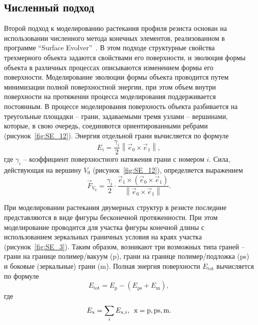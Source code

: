 \subsection{Численный подход}
Второй подход к моделированию растекания профиля резиста основан на использовании численного метода конечных элементов, реализованном в программе ``Surface Evolver''~\cite{Brakke_SE}. В этом подходе структурные свойства трехмерного объекта задаются свойствами его поверхности, и эволюция формы объекта в различных процессах описываются изменением формы его поверхности. Моделирование эволюции формы объекта проводится путем минимизации полной поверхностной энергии, при этом объем внутри поверхности на протяжении процесса моделирования поддерживается постоянным. В процессе моделирования поверхность объекта разбивается на треугольные площадки -- грани, задаваемыми тремя узлами -- вершинами, которые, в свою очередь, соединяются ориентированными ребрами (рисунок~\ref{fig:SE_12}). Энергия отдельной грани вычисляется по формуле
\begin{equation}
	E_i=\frac{\gamma_i}{2}\left\|\vec{e}_0 \times \vec{e}_1\right\|,
\end{equation}
где $\gamma_i$ -- коэффициент поверхностного натяжения грани с номером $i$. Сила, действующая на вершину $V_0$ (рисунок~\ref{fig:SE_12}), определяется выражением
\begin{equation}
	\vec{F}_{V_0}=\frac{\gamma_i}{2} \cdot \frac{\vec{e}_1 \times\left(\vec{e}_0 \times \vec{e}_1\right)}{\left\|\vec{e}_0 \times \vec{e}_1\right\|}.
\end{equation}

При моделировании растекания двумерных структур в резисте последние представляются в виде фигуры бесконечной протяженности. При этом моделирование проводится для участка фигуры конечной длины с использованием зеркальных граничных условия на краях участка (рисунок~\ref{fig:SE_3}). Таким образом, возникают три возможных типа граней -- грани на границе полимер/вакуум (p), грани на границе полимер/подложка (ps) и боковые (зеркальные) грани (m). Полная энергия поверхности $E_\mathrm{tot}$ вычисляется по формуле
\begin{equation}
	E_\mathrm{tot} = E_\mathrm{p} - (E_\mathrm{ps} + E_\mathrm{m}),
\end{equation}
где 
\begin{equation}
	E_\mathrm{x} = \sum_{i} E_{\mathrm{x},i}, \hspace{0.5em} \mathrm{x} = \mathrm{p}, \mathrm{ps}, \mathrm{m}.
\end{equation}

